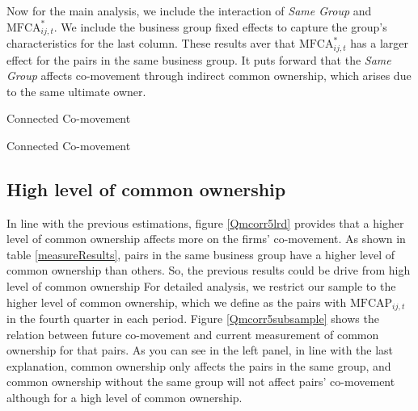 	
	Now for the main analysis, we include the interaction of \textit{Same Group} and $\text{MFCA}^*_{ij,t}$. We include the business group fixed effects to capture the group's characteristics for the last column. These results aver that $\text{MFCA}^*_{ij,t}$ has a larger effect for the pairs in the same business group. It puts forward that the \textit{Same Group}  affects co-movement through indirect common ownership, which arises due to the same ultimate owner. 
	
	
	


{\begin{table}[p]
		\centering
		\caption{Connected Co-movement}
		\label{mresult2part1}
		\resizebox{1\textwidth}{!}{
			
				{}
			
		}
\end{table}}

{\begin{table}[p]
		\centering
		\caption{Connected Co-movement}
		\label{mresult2part2}
		\resizebox{1\textwidth}{!}{
			
				{}
			
		}
\end{table}}


		\FloatBarrier
		
		
		
		\subsection{{High level of common ownership}}
		
			In line with the previous estimations, figure \ref{Qmcorr5lrd} provides that a higher level of common ownership affects more on the firms' co-movement. As shown in table \ref{measureResults}, pairs in the same business group have a higher level of common ownership than others. So, the previous results could be drive from high level of common ownership For detailed analysis, we restrict our sample to the higher level of common ownership, which we define as the pairs with $\text{MFCAP}_{ij,t}$ in the fourth quarter in each period. Figure \ref{Qmcorr5subsample} shows the relation between future co-movement and current measurement of common ownership for that pairs. As you can see in the left panel, in line with the last explanation, common ownership only affects the pairs in the same group, and common ownership without the same group will not affect pairs' co-movement although for a high level of common ownership.
			
